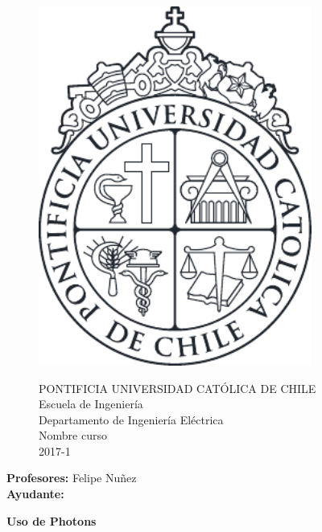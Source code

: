 \documentclass[12pt]{article}
\begin{document}
\renewcommand{\listtablename}{Indice de tablas}
\renewcommand{\tablename}{Tabla}

\begin{figure}
\begin{minipage}{2.5cm}
\includegraphics[width=0.8\textwidth]{LogoUC-BN.pdf}
\end{minipage}
\begin{minipage}{14.5cm}
\vspace{4mm}
{\sc PONTIFICIA UNIVERSIDAD CAT\'OLICA DE CHILE}\\
Escuela de Ingeniería\\
Departamento de Ingeniería Eléctrica\\
Nombre curso \\
2017-1\\
\vspace{0mm}
\hrulefill
\end{minipage}
\end{figure}
\phantom{""}
\vspace{-11mm}
\begin{flushleft}
\scriptsize
\textbf{Profesores:}  Felipe Nuñez \\
\textbf{Ayudante:}
\end{flushleft}
\vspace{-4mm}
\begin{center}
\Large{\textbf{Uso de Photons}}
\end{center}
\normalsize
\end{document}
